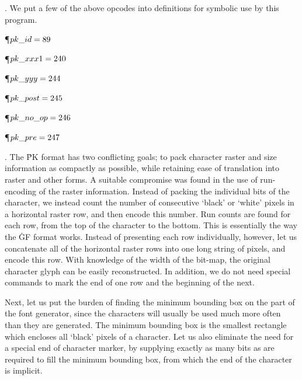 \fi

. We put a few of the above opcodes into definitions for symbolic use by
this program.

\Y\P\D {}$\\{pk\_id}=89$\par
\P\D {}$\\{pk\_xxx1}=240$\par
\P\D {}$\\{pk\_yyy}=244$\par
\P\D {}$\\{pk\_post}=245$\par
\P\D {}$\\{pk\_no\_op}=246$\par
\P\D {}$\\{pk\_pre}=247$\par
\fi

. The \.{PK} format has two conflicting goals; to pack character raster and
size information as compactly as possible, while retaining ease of translation
into raster and other forms.  A suitable compromise was found in the use of
run-encoding of the raster information.  Instead of packing the individual
bits of the character, we instead count the number of consecutive `black' or
`white' pixels in a horizontal raster row, and then encode this number.  Run
counts are found for each row, from the top of the character to the bottom.
This is essentially the way the \.{GF} format works.
Instead of presenting each row individually, however, let us concatenate all
of the horizontal raster rows into one long string of pixels, and encode this
row.  With knowledge of the width of the bit-map, the original character glyph
can be easily reconstructed.  In addition, we do not need special commands to
mark the end of one row and the beginning of the next.

Next, let us put the burden of finding the minimum bounding box on the part
of the font generator, since the characters will usually be used much more
often than they are generated.  The minimum bounding box is the smallest
rectangle which encloses all `black' pixels of a character.  Let us also
eliminate the need for a special end of character marker, by supplying
exactly as many bits as are required to fill the minimum bounding box, from
which the end of the character is implicit.

